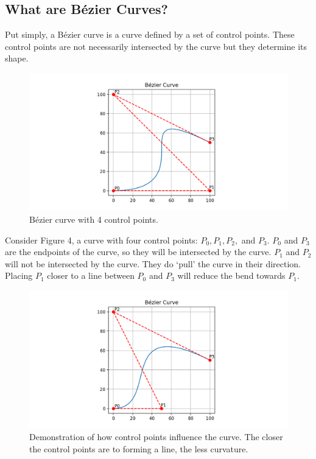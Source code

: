 \documentclass[12pt,letterpaper]{article}
\begin{document}
\subsection{What are B\'ezier Curves?}
Put simply, a B\'ezier curve is a curve defined by a set of control points. These control points are not necessarily intersected by the curve but they determine its shape.
\begin{figure}[H]
\includegraphics[width=15cm]{Figure_1}
\centering
\caption{B\'ezier curve with 4 control points.}
\end{figure}
Consider Figure 4, a curve with four control points: $P_0, P_1, P_2,$ and $P_3$. $P_0$ and $P_3$ are the endpoints of the curve, so they will be intersected by the curve. $P_1$ and $P_2$ will not be intersected by the curve. They do ‘pull’ the curve in their direction. Placing $P_1$ closer to a line between $P_0$ and $P_3$ will reduce the bend towards $P_1$.
\begin{figure}[H]
\includegraphics[width=15cm]{Figure_2}
\centering
\caption{Demonstration of how control points influence the curve. The closer the control points are to forming a line, the less curvature.}
\end{figure}
\end{document}
